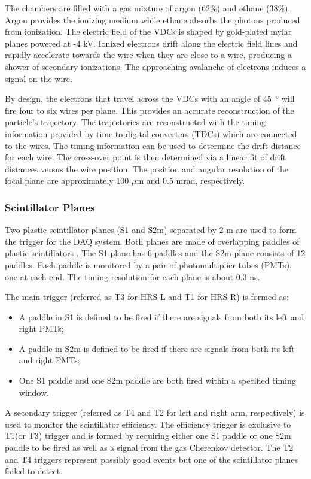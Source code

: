 The chambers are filled with a gas mixture of argon (62\%) and ethane (38\%). Argon provides the ionizing medium while ethane absorbs the photons produced from ionization. The electric field of the VDCs is shaped by gold-plated mylar planes powered at -4 kV. Ionized electrons drift along the electric field lines and rapidly accelerate towards the wire when they are close to a wire, producing a shower of secondary ionizations. The approaching avalanche of electrons induces a signal on the wire.

By design, the electrons that travel across the VDCs with an angle of \SI{45}{\degree} will fire four to six wires per plane. This provides an accurate reconstruction of the particle's trajectory. The trajectories are reconstructed with the timing information provided by time-to-digital converters (TDCs) which are connected to the wires. The timing information can be used to determine the drift distance for each wire. The cross-over point is then determined via a linear fit of drift distances versus the wire position. The position and angular resolution of the focal plane are approximately 100 $\mu$m and 0.5 mrad, respectively.

\subsubsection{Scintillator Planes}

Two plastic scintillator planes (S1 and S2m) separated by 2 m are used to form the trigger for the DAQ system. Both planes are made of overlapping paddles of plastic scintillators \cite{Alcorn2004}. The S1 plane has 6 paddles and the S2m plane consists of 12 paddles. Each paddle is monitored by a pair of photomultiplier tubes (PMTs), one at each end. The timing resolution for each plane is about 0.3 ns.

The main trigger (referred as T3 for HRS-L and T1 for HRS-R) is formed as:
\begin{itemize}[parsep=0pt]
\item A paddle in S1 is defined to be fired if there are signals from both its left and right PMTs;
\item A paddle in S2m is defined to be fired if there are signals from both its left and right PMTs;
\item One S1 paddle and one S2m paddle are both fired within a specified timing window.
\end{itemize}
A secondary trigger (referred as T4 and T2 for left and right arm, respectively) is used to monitor the scintillator efficiency. The efficiency trigger is exclusive to T1(or T3) trigger and is formed by requiring either one S1 paddle or one S2m paddle to be fired as well as a signal from the gas Cherenkov detector. The T2 and T4 triggers represent possibly good events but one of the scintillator planes failed to detect.

